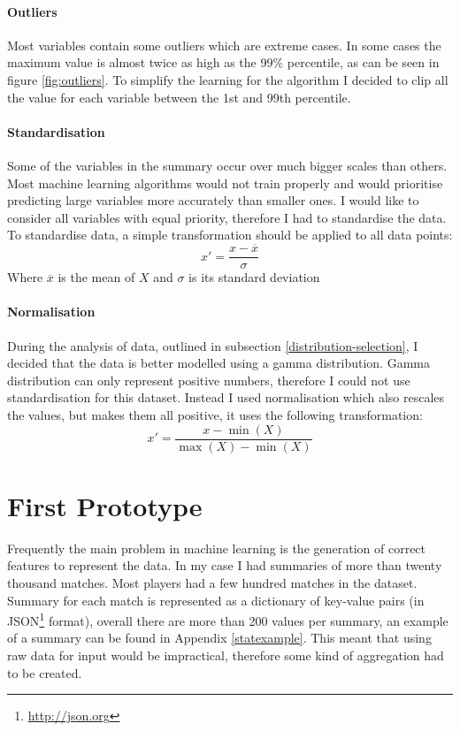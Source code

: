 \documentclass[12pt,a4paper]{book}
\newcommand\mean[1]{\overline{#1}}
\begin{document}
\paragraph{Outliers}
Most variables contain some outliers which are extreme cases.
In some cases the maximum value is almost twice as high as the 99\% percentile, as can be seen in figure \ref{fig:outliers}.
To simplify the learning for the algorithm I decided to clip all the value for each variable between the 1st and 99th percentile.
\paragraph{Standardisation}
Some of the variables in the summary occur over much bigger scales than others.
Most machine learning algorithms would not train properly and would prioritise predicting large variables more accurately than smaller ones.
I would like to consider all variables with equal priority, therefore I had to standardise the data.
To standardise data, a simple transformation should be applied to all data points:
\begin{equation*}
x' = \frac{x - \mean{x}}{\sigma}
\end{equation*}
Where $\mean{x}$ is the mean of $X$ and $\sigma$ is its standard deviation
\paragraph{Normalisation}
During the analysis of data, outlined in subsection \ref{distribution-selection}, I decided that the data is better modelled using a gamma distribution.
Gamma distribution can only represent positive numbers, therefore I could not use standardisation for this dataset.
Instead I used normalisation which also rescales the values, but makes them all positive, it uses the following transformation:
\begin{equation*}
x' = \frac{x - \min(X)}{\max(X)-\min(X)}
\end{equation*}
\section{First Prototype}
Frequently the main problem in machine learning is the generation of correct features to represent the data.
In my case I had summaries of more than twenty thousand matches.
Most players had a few hundred matches in the dataset.
Summary for each match is represented as a dictionary of key-value pairs (in JSON\footnote{\url{http://json.org}} format), overall there are more than 200 values per summary, an example of a summary can be found in Appendix \ref{statexample}.
This meant that using raw data for input would be impractical, therefore some kind of aggregation had to be created.
\end{document}
